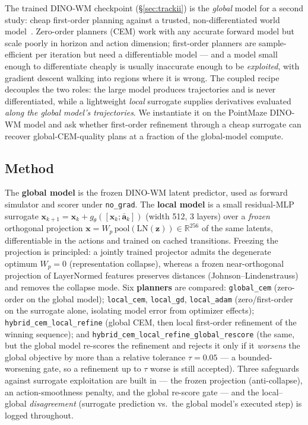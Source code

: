\documentclass[11pt,a4paper]{article}
\newcommand{\zlat}{\mathbf{z}}
\newcommand{\xloc}{\mathbf{x}}
\newcommand{\abar}{\bar{\mathbf{a}}}
\begin{document}
The trained DINO-WM checkpoint (\S\ref{sec:trackii}) is the \emph{global} model
for a second study: cheap first-order planning against a trusted,
non-differentiated world model~\cite{fog2026}. Zero-order planners (CEM) work
with any accurate forward model but scale poorly in horizon and action
dimension; first-order planners are sample-efficient per iteration but need a
differentiable model --- and a model small enough to differentiate cheaply is
usually inaccurate enough to be \emph{exploited}, with gradient descent walking
into regions where it is wrong. The coupled recipe decouples the two roles: the
large model produces trajectories and is never differentiated, while a
lightweight \emph{local} surrogate supplies derivatives evaluated \emph{along
the global model's trajectories}. We instantiate it on the PointMaze DINO-WM
model and ask whether first-order refinement through a cheap surrogate can
recover global-CEM-quality plans at a fraction of the global-model compute.

\subsection{Method}
\label{sec:trackiii-method}

The \textbf{global model} is the frozen DINO-WM latent predictor, used as
forward simulator and scorer under \texttt{no\_grad}. The \textbf{local model}
is a small residual-MLP surrogate
$\xloc_{k+1} = \xloc_k + g_\theta([\xloc_k;\abar_k])$ (width 512, 3 layers) over
a \emph{frozen} orthogonal projection $\xloc = W_{\!p}\,\mathrm{pool}(\mathrm{LN}(\zlat))
\in \mathbb{R}^{256}$ of the same latents, differentiable in the actions and
trained on cached transitions. Freezing the projection is principled: a jointly
trained projector admits the degenerate optimum $W_{\!p}{=}0$ (representation
collapse), whereas a frozen near-orthogonal projection of LayerNormed features
preserves distances (Johnson--Lindenstrauss) and removes the collapse mode. Six
\textbf{planners} are compared: \texttt{global\_cem} (zero-order on the global
model); \texttt{local\_cem}, \texttt{local\_gd}, \texttt{local\_adam}
(zero/first-order on the surrogate alone, isolating model error from optimizer
effects); \texttt{hybrid\_cem\_local\_refine} (global CEM, then local
first-order refinement of the winning sequence); and
\texttt{hybrid\_cem\_local\_refine\_global\_rescore} (the same, but the global
model re-scores the refinement and rejects it only if it \emph{worsens} the
global objective by more than a relative tolerance $\tau{=}0.05$ --- a
bounded-worsening gate, so a refinement up to $\tau$ worse is still accepted).
Three safeguards against
surrogate exploitation are built in --- the frozen projection (anti-collapse),
an action-smoothness penalty, and the global re-score gate --- and the
local--global \emph{disagreement} (surrogate prediction vs.\ the global model's
executed step) is logged throughout.
\end{document}
